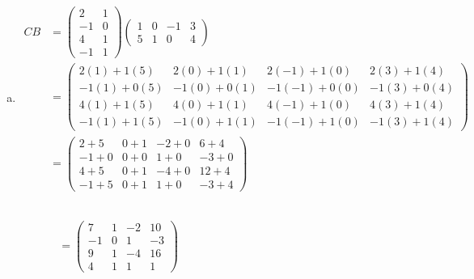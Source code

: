 \documentclass[11pt,letterpaper]{article}
\begin{document}
\begin{enumerate}[(a)]
\item
	\[
	\begin{aligned}
	CB&= \begin{pmatrix} 2 & 1 \\ -1 & 0 \\ 4 & 1 \\ -1 & 1 \end{pmatrix} \begin{pmatrix} 1 & 0 & -1 & 3 \\ 5 & 1 & 0 & 4 \end{pmatrix} \\[0.1cm]
	&= \begin{pmatrix} 2(1) + 1(5) & 2(0) + 1(1) & 2(-1) + 1(0) & 2(3) + 1(4) \\ -1(1) + 0(5) & -1(0) + 0(1) & -1(-1) + 0(0) & -1(3) + 0(4) \\ 4(1) + 1(5) & 4(0) + 1(1) & 4(-1) + 1(0) & 4(3) + 1(4) \\ -1(1) + 1(5) & -1(0) + 1(1) & -1(-1) + 1(0) & -1(3) + 1(4) \end{pmatrix} \\[0.1cm]
	&= \begin{pmatrix} 2 + 5 & 0 + 1 & -2 + 0 & 6 + 4 \\ -1 + 0 & 0 + 0 & 1 + 0 & -3 + 0 \\ 4 + 5 & 0 + 1 & -4 + 0 & 12 + 4 \\ -1 + 5 & 0 + 1 & 1 + 0 & -3 + 4 \end{pmatrix}	
	\end{aligned}
	\]
	
	\[
	\begin{aligned}
	\phantom{CB}&\phantom{=} \phantom{.----------------------------} \\
	&= \begin{pmatrix} 7 & 1 & -2 & 10 \\ -1 & 0 & 1 & -3 \\ 9 & 1 & -4 & 16 \\ 4 & 1 & 1 & 1 \end{pmatrix}
	\end{aligned}
	\] \pspace


\end{enumerate}
\end{document}
